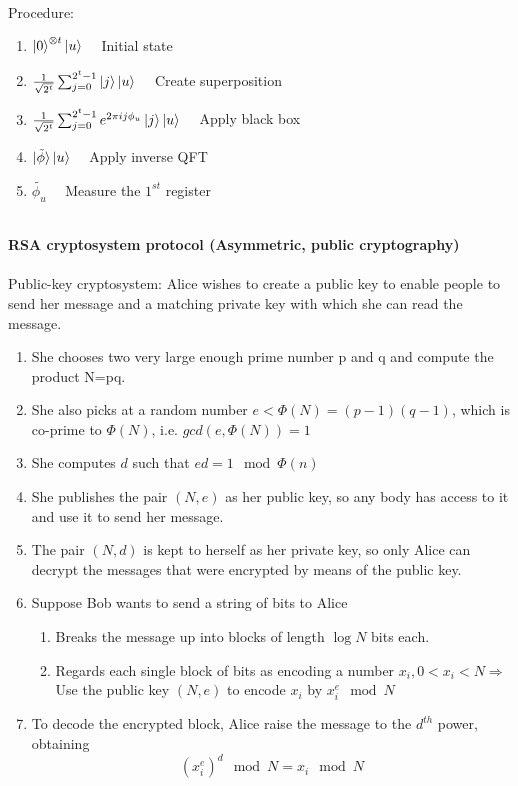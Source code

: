 \documentclass[]{article}
\theoremstyle{nonumberplain}
\begin{document}
\newpage
\ \\
Procedure:
\begin{enumerate}
	\item $\ket{0}^{\otimes t}\ket{u}$ \ \ Initial state
	\item $\frac{1}{\sqrt{2^{t}}} \sum^{2^{t}-1}_{j=0} \ket{j}\ket{u}$ \ \ Create superposition
	\item $\frac{1}{\sqrt{2^{t}}} \sum^{2^{t}-1}_{j=0} e^{2\pi i j\phi_u}\ket{j}\ket{u}$ \ \ Apply black box
	\item $\ket{\tilde{\phi}}\ket{u}$ \ \ Apply inverse QFT
	\item $\tilde{\phi_{u}}$ \ \ Measure the $1^{st}$ register
\end{enumerate}
\ \\
\textbf{RSA cryptosystem protocol (Asymmetric, public cryptography)}\\
\\
Public-key cryptosystem: Alice wishes to create a public key to enable people to send her message and a matching private key with which she can read the message. 
\begin{enumerate}
	\item She chooses two very large enough prime number p and q and compute the product N=pq.
	\item She also picks at a random number $e<\Phi(N)=(p-1)(q-1)$, which is co-prime to  $\Phi(N)$, i.e. $gcd(e,\Phi(N))=1$
	\item She computes $d$ such that $ed=1 \mod{\Phi(n)}$
	\item She publishes the pair $(N,e)$ as her public key, so any body has access to it and use it to send her message.
	\item The pair $(N,d)$ is kept to herself as her private key, so only Alice can decrypt the messages that were encrypted by means of the public key.
	\item Suppose Bob wants to send a string of bits to Alice
\begin{enumerate}
	\item Breaks the message up into blocks of length $\log{N}$ bits each.
	\item Regards each single block of bits as encoding a number $x_{i}, 0<x_{i}<N\Rightarrow$ Use the public key $(N,e)$ to encode  $x_{i}$ by $x_{i}^{e}\mod{N}$
\end{enumerate}
	\item To decode the encrypted block, Alice raise the message to the $d^{th}$ power, obtaining  
\[
	(x_{i}^{e})^{d} \mod{N}=x_{i}\mod{N}
\] 
\end{enumerate}
\end{document}
